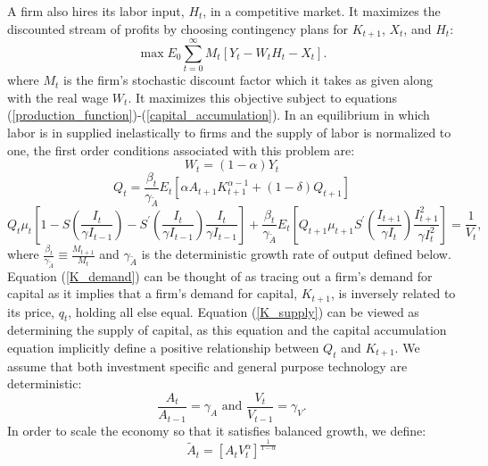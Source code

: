 \documentclass[11pt,fleqn]{article}
\begin{document}
A firm also hires its labor input, $H_t$, in a competitive market.  It maximizes the discounted stream of profits by choosing contingency plans for $K_{t+1}$, $X_t$, and $H_t$:
\begin{equation}
\max E_0 \sum^{\infty}_{t=0} M_t  \left[Y_t - W_t H_t - X_t  \right].
\end{equation}
where $M_t$ is the firm's stochastic discount factor which it takes as given along with the real wage $W_t$. It maximizes this objective subject to equations (\ref{production_function})-(\ref{capital_accumulation}).  In an equilibrium in which labor is in supplied inelastically to firms and the supply of labor is normalized to one, the first order conditions associated with this problem are:
\begin{equation}
W_t = (1-\alpha) Y_t
\end{equation}
\begin{equation}
Q_t = \frac{\beta_t}{\gamma_{\tilde{A}}}E_t  \left[ \alpha A_{t+1} K^{\alpha-1}_{t+1} + (1-\delta) Q_{t+1} \right]  \label{K_demand}
\end{equation}
\begin{equation}
Q_t \mu_t \left[ 1 - S\left(\frac{I_t}{\gamma I_{t-1}}\right)-S^{\prime}\left(\frac{I_t}{\gamma I_{t-1}}\right) \frac{I_t}{\gamma I_{t-1}} \right]
+ \frac{\beta_t}{\gamma_{\tilde{A}}}E_t \left[ Q_{t+1} \mu_{t+1} S^{\prime}\left(\frac{I_{t+1}}{\gamma I_{t}}\right)  \frac{I^2_{t+1}}{\gamma I^2_{t}} \right] = \frac{1}{V_t},  \label{K_supply}
\end{equation}
where $\frac{\beta_t}{\gamma_{\tilde{A}}} \equiv \frac{M_{t+1}}{M_t}$ and $\gamma_{\tilde{A}}$ is the deterministic growth rate of output defined below.
Equation (\ref{K_demand}) can be thought of as tracing out a firm's demand for capital as it implies that a firm's demand for capital, $K_{t+1}$, is inversely related to its price, $q_t$, holding all else equal.  Equation (\ref{K_supply}) can be viewed as determining the supply of capital, as this equation and the capital accumulation equation implicitly define a positive relationship between $Q_t$ and $K_{t+1}$.  We assume that both investment specific and general purpose technology are deterministic:
\begin{equation}
\frac{A_{t}}{A_{t-1}} = \gamma_A  \text{  and  }  \frac{V_{t}}{V_{t-1}}  = \gamma_V.
\end{equation}
In order to scale the economy so that it satisfies balanced growth, we define:
\begin{equation}
\tilde{A}_t = \left[ A_t V^{\alpha}_t \right]^{\frac{1}{1-\alpha}}
\end{equation}
\end{document}
